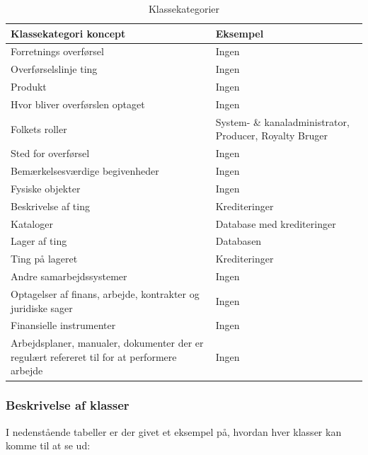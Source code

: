 \begin{table}[H]
    \begin{tabularx}{\textwidth}{|X|X|}
        \hline
        \textbf{Klassekategori koncept} & \textbf{Eksempel} \\
        \hline
        Forretnings overførsel & Ingen\\
        \hline
        Overførselslinje ting & Ingen\\
        \hline
        Produkt & Ingen \\
        \hline
        Hvor bliver overførslen optaget  & Ingen \\
        \hline
        Folkets roller & System- \& kanaladministrator, Producer, Royalty Bruger\\
        \hline
        Sted for overførsel & Ingen \\
        \hline
        Bemærkelsesværdige begivenheder & Ingen \\
        \hline
        Fysiske objekter & Ingen \\
        \hline
        Beskrivelse af ting & Krediteringer\\
        \hline
        Kataloger & Database med krediteringer\\
        \hline
        Lager af ting & Databasen\\
        \hline
        Ting på lageret & Krediteringer\\
        \hline
        Andre samarbejdssystemer & Ingen\\
        \hline
        Optagelser af finans, arbejde, kontrakter og juridiske sager &  Ingen \\
        \hline
        Finansielle instrumenter & Ingen\\
        \hline
        Arbejdsplaner, manualer, dokumenter der er regulært refereret til for at performere arbejde & Ingen\\
        \hline
    \end{tabularx}
    \caption{Klassekategorier}
    \label{table:class_categories}
\end{table}


\subsubsection{Beskrivelse af klasser}
 I nedenstående tabeller er der givet et eksempel på, hvordan hver klasser kan komme til at se ud:
 
